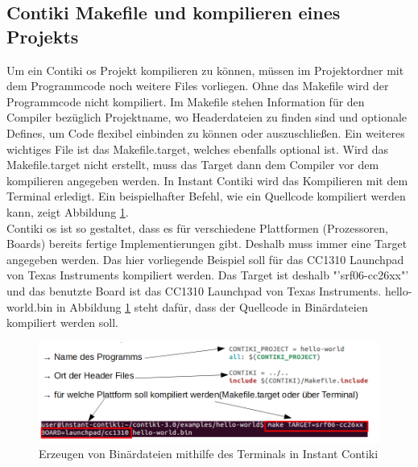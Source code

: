 	\subsection{Contiki Makefile und kompilieren eines Projekts}
	Um ein Contiki \ac{os} Projekt kompilieren zu können, müssen im Projektordner mit dem Programmcode noch weitere Files vorliegen. Ohne das Makefile wird der Programmcode nicht kompiliert. Im Makefile stehen Information für den Compiler bezüglich Projektname, wo Headerdateien zu finden sind und optionale  Defines, um Code flexibel einbinden zu können oder auszuschließen. Ein weiteres wichtiges File ist das Makefile.target, welches ebenfalls optional ist. Wird das Makefile.target nicht erstellt, muss das Target dann dem Compiler vor dem kompilieren angegeben werden. In Instant Contiki wird das Kompilieren mit dem Terminal erledigt. Ein beispielhafter Befehl, wie ein Quellcode kompiliert werden kann, zeigt Abbildung \ref{Makefile&Kompilieren}. \\
	Contiki \ac{os} ist so gestaltet, dass es für verschiedene Plattformen (Prozessoren, Boards) bereits fertige Implementierungen gibt. Deshalb muss immer eine Target angegeben werden. Das hier vorliegende Beispiel soll für das CC1310 Launchpad von Texas Instruments kompiliert werden. Das Target ist deshalb "'srf06-cc26xx"' und das benutzte Board ist das CC1310 Launchpad von Texas Instruments. hello-world.bin in Abbildung \ref{Makefile&Kompilieren} steht dafür, dass der Quellcode in Binärdateien kompiliert werden soll.
	\begin{figure}
		\centering
		\includegraphics[scale=0.5]{Grafiken-Julian/MakefileKompilieren.png}
		\caption{Erzeugen von Binärdateien mithilfe des Terminals in Instant Contiki}
		\label{Makefile&Kompilieren}
	\end{figure}
